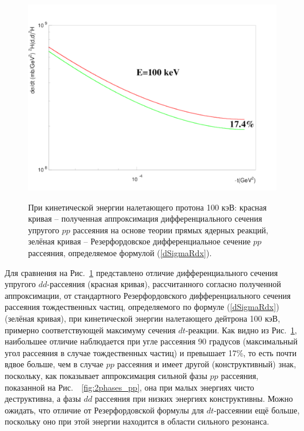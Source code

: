 \documentclass[a4paper,12pt]{article}
\begin{document}
\begin{large}
\begin{figure}[ht]
  {
       \includegraphics[width=0.99\linewidth]{images/dd100kev}
  }
  \caption{При кинетической энергии налетающего протона 100 кэВ: красная кривая -- полученная аппроксимация дифференциального сечения упругого $pp$ рассеяния на основе теории прямых ядерных реакций, зелёная кривая -- Резерфордовское дифференциальное сечение $pp$ рассеяния, определяемое формулой (\ref{dSigmaRdx}).}
  \label{fig:dd100kev}
\end{figure}

  Для сравнения на Рис.~\ref{fig:dd100kev} представлено отличие дифференциального сечения упругого $dd$-рассеяния (красная кривая), рассчитанного согласно полученной аппроксимации, от стандартного Резерфордовского дифференциального сечения рассеяния тождественных частиц, определяемого по формуле (\ref{dSigmaRdx}) (зелёная кривая), при кинетической энергии налетающего дейтрона 100 кэВ, примерно соответствующей максимуму сечения $dt$-реакции.
  Как видно из Рис.~\ref{fig:dd100kev}, наибольшее отличие наблюдается при угле рассеяния 90 градусов (максимальный угол рассеяния в случае тождественных частиц) и превышает 17\%, то есть почти вдвое больше, чем в случае $pp$ рассеяния и имеет другой (конструктивный) знак, поскольку, как показывает аппроксимация сильной фазы $pp$ рассеяния, показанной на  Рис.~~\ref{fig:2phases_pp}, она при малых энергиях чисто деструктивна, а фазы $dd$ рассеяния при низких энергиях конструктивны.
  Можно ожидать, что отличие от Резерфордовской формулы для $dt$-рассеянии ещё больше, поскольку оно при этой энергии находится в области сильного резонанса.
 

\end{large}
\end{document}
